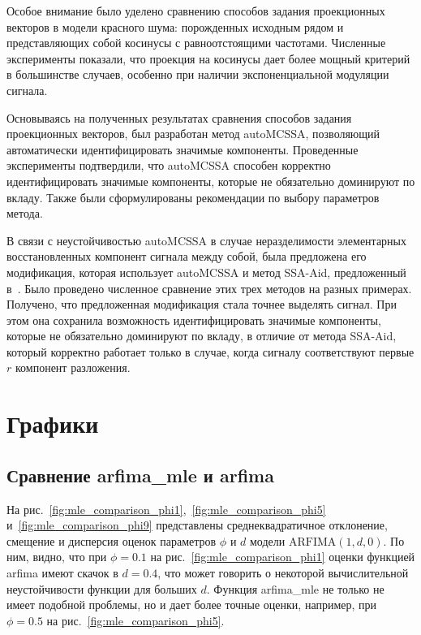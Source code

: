 \documentclass[specialist,
substylefile = spbu_report.rtx,
subf,12pt]{disser}
\theoremstyle{definition}
\begin{document}
Особое внимание было уделено сравнению способов задания проекционных векторов в модели красного шума: порожденных исходным рядом и представляющих собой косинусы с равноотстоящими частотами. Численные эксперименты показали, что проекция на косинусы дает более мощный критерий в большинстве случаев, особенно при наличии экспоненциальной модуляции сигнала.

Основываясь на полученных результатах сравнения способов задания проекционных векторов, был разработан метод autoMCSSA, позволяющий автоматически идентифицировать значимые компоненты. Проведенные эксперименты подтвердили, что autoMCSSA способен корректно идентифицировать значимые компоненты, которые не обязательно доминируют по вкладу. Также были сформулированы рекомендации по выбору параметров метода.

В связи с неустойчивостью autoMCSSA в случае неразделимости элементарных восстановленных компонент сигнала между собой, была предложена его модификация, которая использует autoMCSSA и метод SSA-Aid, предложенный в~\cite{Dudnik2025}. Было проведено численное сравнение этих трех методов на разных примерах. Получено, что предложенная модификация стала точнее выделять сигнал. При этом она сохранила возможность идентифицировать значимые компоненты, которые не обязательно доминируют по вкладу, в отличие от метода SSA-Aid, который корректно работает только в случае, когда сигналу соответствуют первые $r$ компонент разложения.




\appendix

\chapter{Графики}

\section{Сравнение \textsf{arfima\_mle} и \textsf{arfima}}\label{sect:mle_comparison}

На рис.~\ref{fig:mle_comparison_phi1},~\ref{fig:mle_comparison_phi5} и~\ref{fig:mle_comparison_phi9} представлены среднеквадратичное отклонение, смещение и дисперсия оценок параметров $\phi$ и $d$ модели $\textrm{ARFIMA}(1, d, 0)$. По ним, видно, что при $\phi=0.1$ на рис.~\ref{fig:mle_comparison_phi1} оценки функцией \textsf{arfima} имеют скачок в $d=0.4$, что может говорить о некоторой вычислительной неустойчивости функции для больших $d$. Функция \textsf{arfima\_mle} не только не имеет подобной проблемы, но и дает более точные оценки, например, при $\phi=0.5$ на рис.~\ref{fig:mle_comparison_phi5}.
\end{document}

